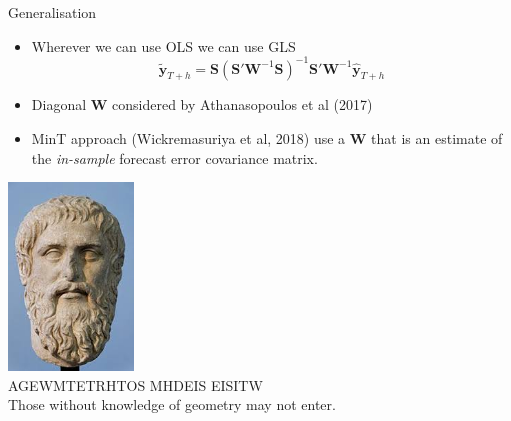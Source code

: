 \documentclass{beamer}
\begin{document}
\begin{frame}{Generalisation}
  \begin{itemize}  
  \item Wherever we can use OLS we can use GLS
  \begin{equation*}
  \tilde{\bm{y}}_{T+h}={\bm S}({\bm S}'{\bm W}^{-1}{\bm S})^{-1}{\bm S}'{\bm W}^{-1}{\hat{\bm{y}}}_{T+h}
  \end{equation*}
  \item Diagonal ${\bm W}$ considered by Athanasopoulos et al (2017)
  \item MinT approach (Wickremasuriya et al, 2018) use a ${\bm W}$ that is an estimate of the {\em in-sample} forecast error covariance matrix.
  \end{itemize}
\end{frame}
%
\begin{frame}
\centering
\includegraphics[height=5cm]{Figs/Plato.jpeg}\\
\textgreek{AGEWMTETRHTOS MHDEIS EISITW}\\
Those without knowledge of geometry may not enter.
\end{frame}
\end{document}
